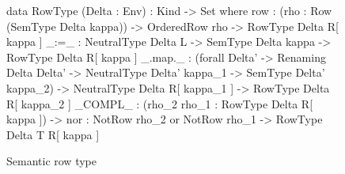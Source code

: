 \begin{figure}
\begin{agda}
data RowType (Delta : Env)  : Kind -> Set where 
  row : (rho : Row (SemType Delta kappa)) -> 
         OrderedRow rho -> 
         RowType Delta R[ kappa ]
  _:=_ : NeutralType Delta L -> 
        SemType Delta kappa -> 
        RowType Delta R[ kappa ]
  _.map._ : (forall {Delta'} ->  
         Renaming Delta Delta' -> 
         NeutralType Delta' kappa_1 -> 
         SemType Delta' kappa_2) -> 
         NeutralType Delta R[ kappa_1 ] -> 
         RowType Delta R[ kappa_2 ]
  _COMPL_ : (rho_2  rho_1 : RowType Delta R[ kappa ]) ->
        {nor : NotRow rho_2  or  NotRow rho_1} -> 
         RowType Delta T R[ kappa ]
\end{agda}
\caption{Semantic row type}
\label{fig:semantic-rows}
\end{figure}
